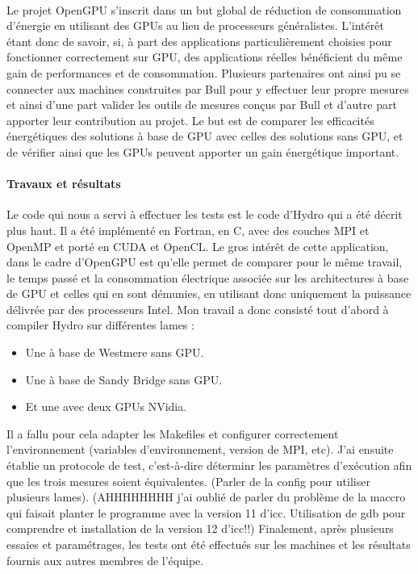 \documentclass{article}
\begin{document}
				\paragraph{}
				Le projet OpenGPU s'inscrit dans un but global de réduction de consommation d’énergie en utilisant des GPUs 
				au lieu de processeurs généralistes. L'intérêt étant donc de savoir, si, à part des applications particulièrement 
				choisies pour fonctionner correctement sur GPU, des applications réelles bénéficient du même gain de performances 
				et de consommation. \newline
				Plusieurs partenaires ont ainsi pu se connecter aux machines construites par Bull pour y effectuer leur propre 
				mesures et ainsi d'une part valider les outils de mesures conçus par Bull et d'autre part apporter leur contribution 
				au projet. \newline
				Le but est de comparer les efficacités énergétiques des solutions à base de GPU avec celles des solutions sans 
				GPU, et de vérifier ainsi que les GPUs peuvent apporter un gain énergétique important.
				\paragraph{Travaux et résultats}
				Le code qui nous a servi à effectuer les tests est le code d'Hydro qui a été décrit plus haut. Il a été 
				implémenté en Fortran, en C, avec des couches MPI et OpenMP et porté en CUDA et OpenCL.
				Le gros intérêt de cette application, dans le cadre d'OpenGPU est qu'elle permet de comparer pour le même 
				travail, le temps passé et la consommation électrique associée sur les architectures à base de GPU et celles 
				qui en sont démunies, en utilisant donc uniquement la puissance délivrée par des processeurs Intel.
				Mon travail a donc consisté tout d'abord à compiler Hydro sur différentes lames : \newline
				\begin{itemize}
				\item Une à base de Westmere sans GPU.
				\item Une à base de Sandy Bridge sans GPU.
				\item Et une avec deux GPUs NVidia. \newline
				\end{itemize}
				Il a fallu pour cela adapter les Makefiles et configurer correctement l'environnement (variables 
				d'environnement, version de MPI, etc). 
				J'ai ensuite établie un protocole de test, c'est-à-dire déterminr les paramètres d'exécution afin que les trois 
				mesures soient équivalentes. (Parler de la config pour utiliser plusieurs lames). \newline
				(AHHHHHHHH j'ai oublié de parler du problème de la maccro qui faisait planter le programme avec la version 11
				d'icc. Utilisation de gdb pour comprendre et installation de la version 12 d'icc!!) \newline
				Finalement, après plusieurs essaies et paramétrages, les tests ont été effectués 
				sur les machines et les résultats fournis aux autres membres de l'équipe.
\end{document}
